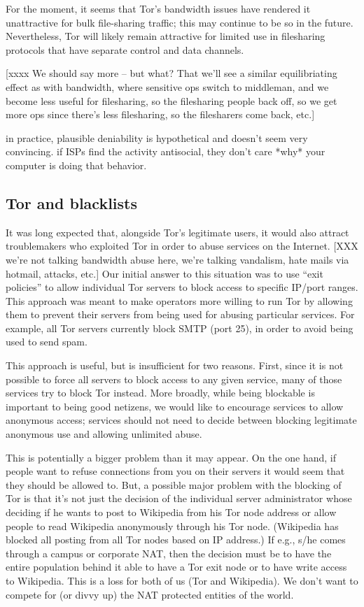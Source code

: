 \documentclass{llncs}
\begin{document}
For the moment, it seems that Tor's bandwidth issues have rendered it
unattractive for bulk file-sharing traffic; this may continue to be so in the
future.  Nevertheless, Tor will likely remain attractive for limited use in
filesharing protocols that have separate control and data channels.

[xxxx We should say more -- but what?  That we'll see a similar
  equilibriating effect as with bandwidth, where sensitive ops switch to
  middleman, and we become less useful for filesharing, so the filesharing
  people back off, so we get more ops since there's less filesharing, so the
  filesharers come back, etc.]

in practice, plausible deniability is hypothetical and doesn't seem very
convincing. if ISPs find the activity antisocial, they don't care *why*
your computer is doing that behavior.

\subsection{Tor and blacklists}

It was long expected that, alongside Tor's legitimate users, it would also
attract troublemakers who exploited Tor in order to abuse services on the
Internet.
[XXX we're not talking bandwidth abuse here, we're talking vandalism,
hate mails via hotmail, attacks, etc.]
Our initial answer to this situation was to use ``exit policies''
to allow individual Tor servers to block access to specific IP/port ranges.
This approach was meant to make operators more willing to run Tor by allowing
them to prevent their servers from being used for abusing particular
services.  For example, all Tor servers currently block SMTP (port 25), in
order to avoid being used to send spam.

This approach is useful, but is insufficient for two reasons.  First, since
it is not possible to force all servers to block access to any given service,
many of those services try to block Tor instead.  More broadly, while being
blockable is important to being good netizens, we would like to encourage
services to allow anonymous access; services should not need to decide
between blocking legitimate anonymous use and allowing unlimited abuse.

This is potentially a bigger problem than it may appear. 
On the one hand, if people want to refuse connections from you on
their servers it would seem that they should be allowed to.  But, a
possible major problem with the blocking of Tor is that it's not just
the decision of the individual server administrator whose deciding if
he wants to post to Wikipedia from his Tor node address or allow
people to read Wikipedia anonymously through his Tor node. (Wikipedia
has blocked all posting from all Tor nodes based on IP address.) If e.g.,
s/he comes through a campus or corporate NAT, then the decision must
be to have the entire population behind it able to have a Tor exit
node or to have write access to Wikipedia. This is a loss for both of us (Tor
and Wikipedia). We don't want to compete for (or divvy up) the NAT
protected entities of the world.
\end{document}
